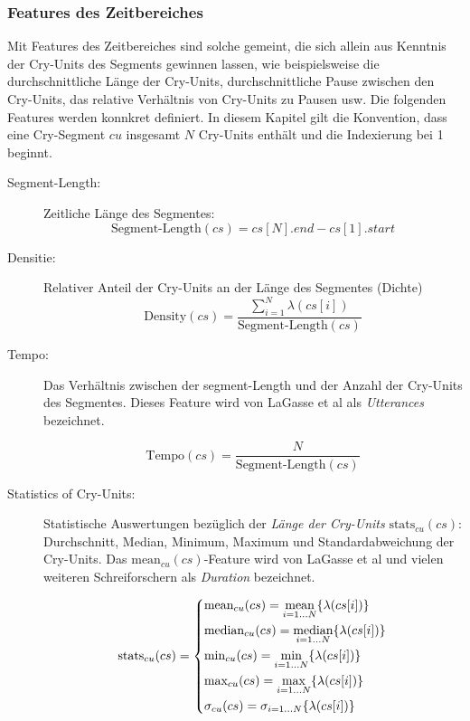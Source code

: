 \subsubsection{Features des Zeitbereiches}

Mit Features des Zeitbereiches sind solche gemeint, die sich allein aus Kenntnis der Cry-Units des Segments gewinnen lassen, wie beispielsweise die durchschnittliche Länge der Cry-Units, durchschnittliche Pause zwischen den Cry-Units, das relative Verhältnis von Cry-Units zu Pausen usw. Die folgenden Features werden konnkret definiert. In diesem Kapitel gilt die Konvention, dass eine Cry-Segment $cu$ insgesamt $N$ Cry-Units enthält und die Indexierung bei 1 beginnt.

\begin{description}
\item[Segment-Length:] Zeitliche Länge des Segmentes:
\begin{equation}
\text{Segment-Length}(cs) = cs[N].end - cs[1].start
\label{eq:segment_length}
\end{equation}

\item[Densitie:] Relativer Anteil der Cry-Units an der Länge des Segmentes (\glqq Dichte\grqq{})
\begin{equation}
\text{Density}(cs) = \frac{\sum_{i = 1}^{N} \lambda(cs[i])}{\text{Segment-Length}(cs)}
\end{equation}

\item[Tempo:] Das Verhältnis zwischen der segment-Length und der Anzahl der Cry-Units des Segmentes. Dieses Feature wird von LaGasse et al \cite[S. 85]{parentalPerception} als \emph{Utterances} bezeichnet.

\begin{equation}
\text{Tempo}(cs) =  \frac{N}{\text{Segment-Length}(cs)}
\end{equation}

\item[Statistics of Cry-Units:] Statistische Auswertungen bezüglich der \emph{Länge der Cry-Units} $\text{stats}_{cu}(cs)$: Durchschnitt, Median, Minimum, Maximum und Standardabweichung der Cry-Units. Das $\text{mean}_{cu}(cs)$-Feature wird von LaGasse et al \cite[S. 85]{parentalPerception} und vielen weiteren Schreiforschern als \emph{Duration} bezeichnet.

\begin{equation}
\text{stats}_{cu}(cs) = 
\begin{dcases}
\text{mean}_{cu}(cs) = \operatorname*{mean}_{i = 1 \ldots N}\{\lambda(cs[i])\} \\
\text{median}_{cu}(cs) = \operatorname*{median}_{i = 1 \ldots N}\{\lambda(cs[i])\} \\
\text{min}_{cu}(cs) = \operatorname*{min}_{i = 1 \ldots N}\{\lambda(cs[i])\} \\
\text{max}_{cu}(cs) = \operatorname*{max}_{i = 1 \ldots N}\{\lambda(cs[i])\} \\
\sigma_{cu}(cs) =  \sigma_{i = 1 \ldots N}\{\lambda(cs[i])\} 
\end{dcases}
\label{eq:featuresOfCryUnits}
\end{equation}


\end{description}
